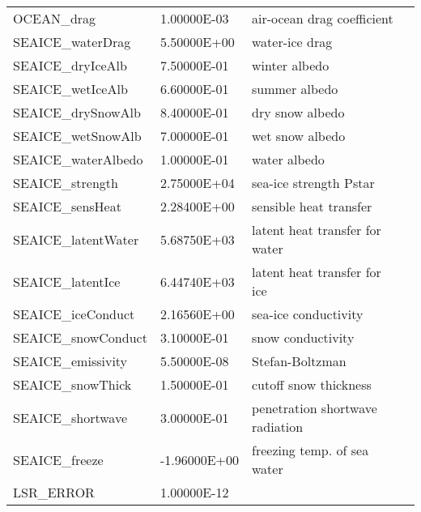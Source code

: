 \begin{table}
{\begin{tabular}{|lllc|}
   OCEAN\_drag          &                   1.00000E-03
    &   air-ocean drag coefficient 
    &  %
    \\
   SEAICE\_waterDrag    &                   5.50000E+00
    &   water-ice drag 
    &  %
    \\
   SEAICE\_dryIceAlb    &                   7.50000E-01
    &   winter albedo 
    &  %
    \\
   SEAICE\_wetIceAlb    &                   6.60000E-01
    &   summer albedo 
    &  %
    \\
   SEAICE\_drySnowAlb   &                   8.40000E-01
    &   dry snow albedo 
    &  %
    \\
   SEAICE\_wetSnowAlb   &                   7.00000E-01
    &   wet snow albedo 
    &  %
    \\
   SEAICE\_waterAlbedo  &                   1.00000E-01
    &   water albedo 
    &  %
    \\
   SEAICE\_strength     &                   2.75000E+04
    &   sea-ice strength Pstar 
    &  %
    \\
   SEAICE\_sensHeat     &                   2.28400E+00
    &   sensible heat transfer 
    &  %
    \\
   SEAICE\_latentWater  &                   5.68750E+03
    &   latent heat transfer for water 
    &  %
    \\
   SEAICE\_latentIce    &                   6.44740E+03
    &   latent heat transfer for ice 
    &  %
    \\
   SEAICE\_iceConduct   &                   2.16560E+00
    &   sea-ice conductivity 
    &  %
    \\
   SEAICE\_snowConduct  &                   3.10000E-01
    &   snow conductivity 
    &  %
    \\
   SEAICE\_emissivity   &                   5.50000E-08
    &   Stefan-Boltzman 
    &  %
    \\
   SEAICE\_snowThick    &                   1.50000E-01
    &   cutoff snow thickness 
    &  %
    \\
   SEAICE\_shortwave    &                   3.00000E-01
    &   penetration shortwave radiation 
    &  %
    \\
   SEAICE\_freeze       &                  -1.96000E+00
    &   freezing temp. of sea water 
    &  %
    \\
   LSR\_ERROR           &                   1.00000E-12

\end{tabular}}
\end{table}
